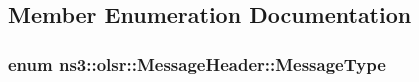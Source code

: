 \subsection{Member Enumeration Documentation}
\subsubsection[{\texorpdfstring{Message\+Type}{MessageType}}]{\setlength{\rightskip}{0pt plus 5cm}enum {\bf ns3\+::olsr\+::\+Message\+Header\+::\+Message\+Type}}\hypertarget{classns3_1_1olsr_1_1MessageHeader_aff5a31b07c415097a5ada41d53e9a99e}{}\label{classns3_1_1olsr_1_1MessageHeader_aff5a31b07c415097a5ada41d53e9a99e}
